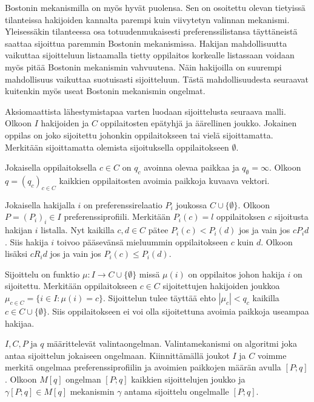 \documentclass[gradu]{tktltiki}
\begin{document}
Bostonin mekanismilla on myös hyvät puolensa. Sen on osoitettu olevan
tietyissä tilanteissa hakijoiden kannalta parempi kuin viivytetyn
valinnan mekanismi. Yleisessäkin tilanteessa osa totuudenmukaisesti
preferenssilistansa täyttäneistä saattaa sijoittua paremmin Bostonin
mekanismissa. Hakijan mahdollisuutta vaikuttaa sijoitteluun
listaamalla tietty oppilaitos korkealle listassaan voidaan myös pitää
Bostonin mekanismin vahvuutena. Näin hakijoilla on suurempi
mahdollisuus vaikuttaa suotuisasti sijoitteluun. Tästä
mahdollisuudesta seuraavat kuitenkin myös useat Bostonin mekanismin
ongelmat.

Aksiomaattista lähestymistapaa varten luodaan sijoittelusta seuraava
malli. Olkoon \(I\) hakijoiden ja \(C\) oppilaitosten epätyhjä ja
äärellinen joukko. Jokainen oppilas on joko sijoitettu johonkin
oppilaitokseen tai vielä sijoittamatta. Merkitään sijoittamatta
olemista sijoituksella oppilaitokseen \(\emptyset\).

Jokaisella oppilaitoksella \(c \in C\) on \(q_c\) avoinna olevaa
paikkaa ja \(q_{\emptyset} = \infty\). Olkoon \(q = (q_c)_{c \in C}\)
kaikkien oppilaitosten avoimia paikkoja kuvaava vektori.

Jokaisella hakijalla \(i\) on preferenssirelaatio \(P_i\) joukossa \(C
\cup \{\emptyset\}\). Olkoon \(P = (P_i)_i \in I\)
preferenssiprofiili. Merkitään \(P_i(c) = l\) oppilaitoksen \(c\)
sijoitusta hakijan \(i\) listalla. Nyt kaikilla \(c, d \in C\) pätee
\(P_i(c) < P_i(d)\) jos ja vain jos \(cP_id\). Siis hakija \(i\)
toivoo pääsevänsä mieluummin oppilaitokseen \(c\) kuin \(d\). Olkoon
lisäksi \(cR_id\) jos ja vain jos \(P_i(c) \leq P_i(d)\).

Sijoittelu on funktio \(\mu : I \rightarrow C \cup \{\emptyset\}\)
missä \(\mu(i)\) on oppilaitos johon hakija \(i\) on sijoitettu.
Merkitään oppilaitokseen \(c \in C\) sijoitettujen hakijoiden joukkoa
\(\mu_{c \in C} = \{i \in I : \mu(i) = c\}\). Sijoittelun tulee
täyttää ehto \(|\mu_c| < q_c\) kaikilla \(c \in C \cup
\{\emptyset\}\). Siis oppilaitokseen ei voi olla sijoitettuna avoimia
paikkoja useampaa hakijaa.

\(I, C, P \text{ ja } q\) määrittelevät valintaongelman.
Valintamekanismi on algoritmi joka antaa sijoittelun jokaiseen
ongelmaan. Kiinnittämällä joukot \(I\) ja \(C\) voimme merkitä
ongelmaa preferenssiprofiilin ja avoimien paikkojen määrän avulla
\([P;q]\). Olkoon \(M[q]\) ongelman \([P;q]\) kaikkien sijoittelujen
joukko ja \(\gamma [P;q] \in M[q]\) mekanismin \(\gamma\) antama
sijoittelu ongelmalle \([P;q]\).
\end{document}

